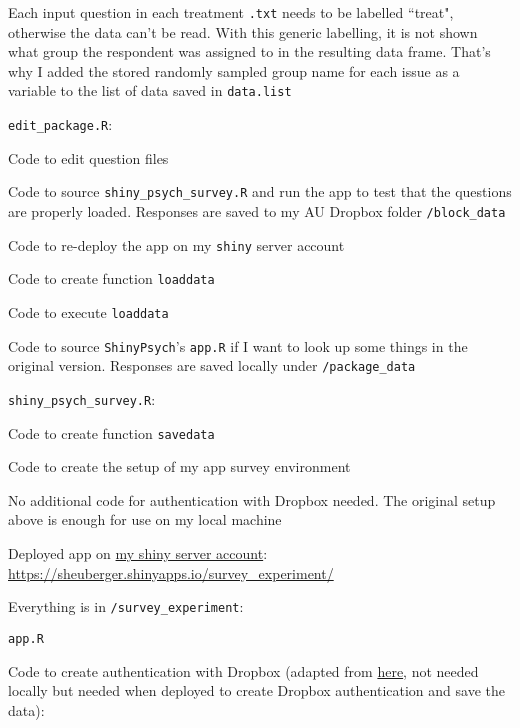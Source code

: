 \begin{coi}
\begin{coi}
				\item Each input question in each treatment {\tt .txt} needs to be labelled ``treat", otherwise the data can't be read. With this generic labelling, it is not shown what group the respondent was assigned to in the resulting data frame. That's why I added the stored randomly sampled group name for each issue as a variable to the list of data saved in {\tt data.list} 
			\end{coi}
		\item {\tt edit\_package.R}:
			\begin{coi}
				\item Code to edit question files
				\item Code to source {\tt shiny\_psych\_survey.R} and run the app to test that the questions are properly loaded. Responses are saved to my AU Dropbox folder {\tt /block\_data}
				\item Code to re-deploy the app on my {\tt shiny} server account
				\item Code to create function {\tt loaddata}
				\item Code to execute {\tt loaddata}
				\item Code to source {\tt ShinyPsych}'s {\tt app.R} if I want to look up some things in the original version. Responses are saved locally under {\tt /package\_data}
			\end{coi}
		\item {\tt shiny\_psych\_survey.R}:
			\begin{coi}
				\item Code to create function {\tt savedata}
				\item Code to create the setup of my app survey environment
				\item No additional code for authentication with Dropbox needed. The original setup above is enough for use on my local machine 
			\end{coi}
		\item Deployed app on \href{https://www.shinyapps.io/admin/#/login}{my shiny server account}: \href{https://sheuberger.shinyapps.io/survey_experiment/}{https://sheuberger.shinyapps.io/survey\_experiment/}
			\begin{coi}
				\item Everything is in {\tt /survey\_experiment}:
					\begin{coi}
						\item {\tt app.R}
							\begin{coi}
								\item Code to create authentication with Dropbox (adapted from \href{https://github.com/karthik/rdrop2}{here}, not needed locally but needed when deployed to create Dropbox authentication and save the data):

\end{coi}
\end{coi}
\end{coi}
\end{coi}
